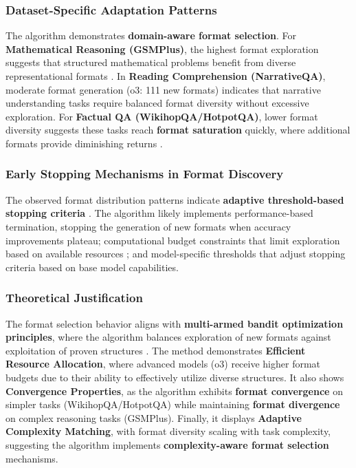 \subsubsection{Dataset-Specific Adaptation Patterns}

The algorithm demonstrates \textbf{domain-aware format selection}. For \textbf{Mathematical Reasoning (GSMPlus)}, the highest format exploration suggests that structured mathematical problems benefit from diverse representational formats \cite{xu2025content}. In \textbf{Reading Comprehension (NarrativeQA)}, moderate format generation (o3: 111 new formats) indicates that narrative understanding tasks require balanced format diversity without excessive exploration. For \textbf{Factual QA (WikihopQA/HotpotQA)}, lower format diversity suggests these tasks reach \textbf{format saturation} quickly, where additional formats provide diminishing returns \cite{wu2024adaptive}.

\subsubsection{Early Stopping Mechanisms in Format Discovery}

The observed format distribution patterns indicate \textbf{adaptive threshold-based stopping criteria} \cite{olamendy2023understanding}. The algorithm likely implements performance-based termination, stopping the generation of new formats when accuracy improvements plateau; computational budget constraints that limit exploration based on available resources \cite{clark2024scaling}; and model-specific thresholds that adjust stopping criteria based on base model capabilities.

\subsubsection{Theoretical Justification}

The format selection behavior aligns with \textbf{multi-armed bandit optimization principles}, where the algorithm balances exploration of new formats against exploitation of proven structures \cite{10_1}. The method demonstrates \textbf{Efficient Resource Allocation}, where advanced models (o3) receive higher format budgets due to their ability to effectively utilize diverse structures. It also shows \textbf{Convergence Properties}, as the algorithm exhibits \textbf{format convergence} on simpler tasks (WikihopQA/HotpotQA) while maintaining \textbf{format divergence} on complex reasoning tasks (GSMPlus). Finally, it displays \textbf{Adaptive Complexity Matching}, with format diversity scaling with task complexity, suggesting the algorithm implements \textbf{complexity-aware format selection} mechanisms.


